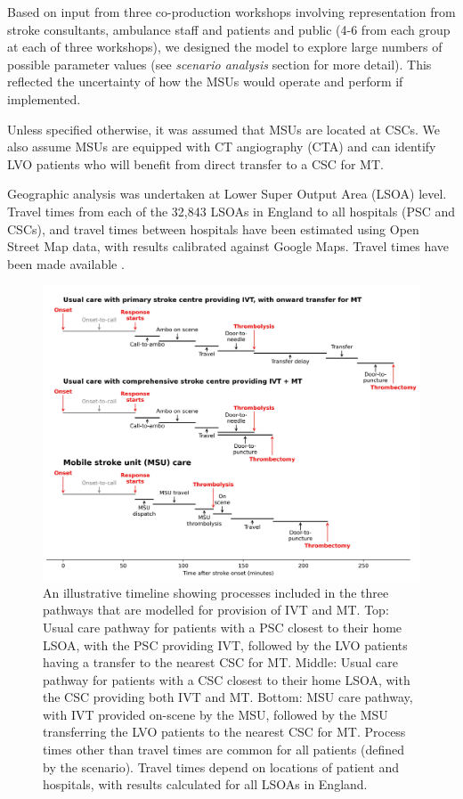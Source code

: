 Based on input from three co-production workshops \cite{moseley_co-design_2024} involving representation from stroke consultants, ambulance staff and patients and public (4-6 from each group at each of three workshops), we designed the model to explore large numbers of possible parameter values (see \emph{scenario analysis} section for more detail). This reflected the uncertainty of how the MSUs would operate and perform if implemented.

Unless specified otherwise, it was assumed that MSUs are located at CSCs. We also assume MSUs are equipped with CT angiography (CTA) and can identify LVO patients who will benefit from direct transfer to a CSC for MT.

Geographic analysis was undertaken at Lower Super Output Area (LSOA) level. Travel times from each of the 32,843 LSOAs in England to all hospitals (PSC and CSCs), and travel times between hospitals have been estimated using Open Street Map data, with results calibrated against Google Maps. Travel times have been made available \cite{gitlab1}.

\begin{figure}[h]
    \centering
    \includegraphics[width=0.85\linewidth]{images/stroke_treatment.jpg}
    \caption{An illustrative timeline showing processes included in the three pathways that are modelled for provision of IVT and MT. Top: Usual care pathway for patients with a PSC closest to their home LSOA, with the PSC providing IVT, followed by the LVO patients having a transfer to the nearest CSC for MT. Middle: Usual care pathway for patients with a CSC closest to their home LSOA, with the CSC providing both IVT and MT. Bottom: MSU care pathway, with IVT provided on-scene by the MSU, followed by the MSU transferring the LVO patients to the nearest CSC for MT. Process times other than travel times are common for all patients (defined by the scenario). Travel times depend on locations of patient and hospitals, with results calculated for all LSOAs in England.}
    \label{fig:process}
\end{figure}

